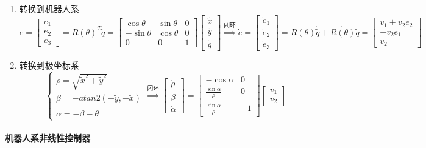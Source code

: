 \documentclass[
12pt, %
a4paper, 
oneside, %
headinclude,footinclude, %
]{scrartcl}
\begin{document}
\begin{enumerate}
\item 转换到机器人系
$$ 
e = \begin{bmatrix} e_1 \\ e_2 \\ e_3 \end{bmatrix} = R(\theta)^T \tilde{q} = \begin{bmatrix} \cos\theta & \sin\theta & 0 \\ -\sin\theta & \cos\theta & 0 \\ 0 & 0 & 1 \end{bmatrix} \begin{bmatrix} \tilde{x} \\ \tilde{y} \\ \tilde{\theta} \end{bmatrix}
\overset{\text{闭环}}{\Longrightarrow}
\dot{e} = \begin{bmatrix} \dot{e}_1 \\ \dot{e}_2 \\ \dot{e}_3 \end{bmatrix} = R(\theta) \dot{\tilde{q}} + \dot{R(\theta)}\tilde{q} = \begin{bmatrix} v_1 + v_2 e_2 \\ -v_2 e_1 \\ v_2 \end{bmatrix} 
$$
\item 转换到极坐标系
$$ \begin{cases} \rho = \sqrt{\tilde{x}^2 + \tilde{y}^2} \\ \beta = -atan2(-\tilde{y}, -\tilde{x}) \\ \alpha = -\beta - \tilde{\theta} \end{cases}
\overset{\text{闭环}}{\Longrightarrow}
\begin{bmatrix} \dot{\rho} \\ \dot{\beta} \\ \dot{\alpha} \end{bmatrix} = \begin{bmatrix} -\cos\alpha & 0 \\ \frac{\sin\alpha}{\rho} & 0 \\ \frac{\sin\alpha}{\rho} & -1 \end{bmatrix} \begin{bmatrix} v_1 \\ v_2 \end{bmatrix}
$$ 
\end{enumerate}
\paragraph{机器人系非线性控制器}~\\
\end{document}
